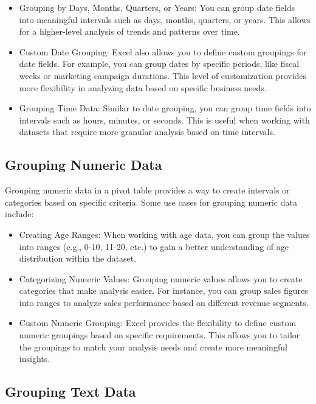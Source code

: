 \documentclass[
]{book}
\begin{document}
\begin{itemize}
\item
  Grouping by Days, Months, Quarters, or Years: You can group date fields into meaningful intervals such as days, months, quarters, or years. This allows for a higher-level analysis of trends and patterns over time.
\item
  Custom Date Grouping: Excel also allows you to define custom groupings for date fields. For example, you can group dates by specific periods, like fiscal weeks or marketing campaign durations. This level of customization provides more flexibility in analyzing data based on specific business needs.
\item
  Grouping Time Data: Similar to date grouping, you can group time fields into intervals such as hours, minutes, or seconds. This is useful when working with datasets that require more granular analysis based on time intervals.
\end{itemize}

\hypertarget{grouping-numeric-data}{%
\subsection{Grouping Numeric Data}\label{grouping-numeric-data}}

Grouping numeric data in a pivot table provides a way to create intervals or categories based on specific criteria. Some use cases for grouping numeric data include:

\begin{itemize}
\item
  Creating Age Ranges: When working with age data, you can group the values into ranges (e.g., 0-10, 11-20, etc.) to gain a better understanding of age distribution within the dataset.
\item
  Categorizing Numeric Values: Grouping numeric values allows you to create categories that make analysis easier. For instance, you can group sales figures into ranges to analyze sales performance based on different revenue segments.
\item
  Custom Numeric Grouping: Excel provides the flexibility to define custom numeric groupings based on specific requirements. This allows you to tailor the groupings to match your analysis needs and create more meaningful insights.
\end{itemize}

\hypertarget{grouping-text-data}{%
\subsection{Grouping Text Data}\label{grouping-text-data}}
\end{document}
